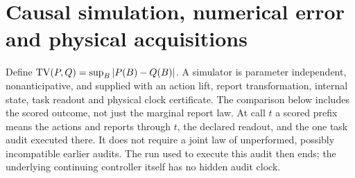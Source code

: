 \section{Causal simulation, numerical error and physical acquisitions}\label{sec:resources}
Define $\operatorname{TV}(P,Q)=\sup_B|P(B)-Q(B)|$. A simulator is parameter independent, nonanticipative, and supplied with an action lift, report transformation, internal state, task readout and physical clock certificate. The comparison below includes the scored outcome, not just the marginal report law. At call $t$ a scored prefix means the actions and reports through $t$, the declared readout, and the one task audit executed there. It does not require a joint law of unperformed, possibly incompatible earlier audits. The run used to execute this audit then ends; the underlying continuing controller itself has no hidden audit clock.

